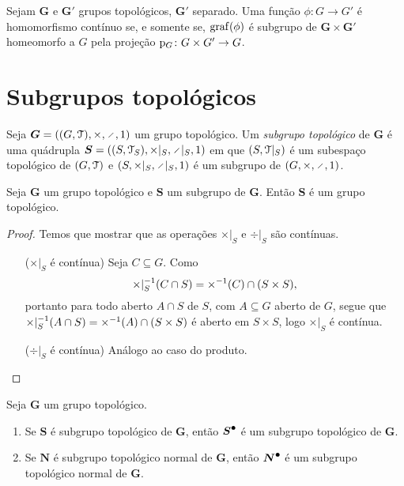 \begin{proposition}
Sejam $\bm G$ e $\bm G'$ grupos topológicos, $\bm G'$ separado. Uma função $\phi\colon G \to G'$ é homomorfismo contínuo se, e somente se,
$\operatorname{graf}(\phi)$ é subgrupo de $\bm G \times \bm G'$ homeomorfo a $G$ pela projeção $\mathrm{p}_G\colon G \times G' \to G$.
\end{proposition}

\section{Subgrupos topológicos}

\begin{definition}
Seja $\bm G = ((G,\topo),\times,\div,\id)$ um grupo topológico. Um \emph{subgrupo topológico} de $\bm G$ é uma quádrupla $\bm S = ((S,\topo_S),\times|_S,\div|_S,\id)$ em que $(S,\mathcal{T}|_S)$ é um subespaço topológico de $(G,\mathcal{T})$ e $(S,\times|_S,\div|_S,\id)$ é um subgrupo de $(G,\times,\div,\id)$.
\end{definition}

\begin{proposition}
Seja $\bm G$ um grupo topológico e $\bm S$ um subgrupo de $\bm G$. Então $\bm S$ é um grupo topológico.
\end{proposition}
\begin{proof}
Temos que mostrar que as operações $\times|_S$ e $\div|_S$ são contínuas.
	\begin{enumerate}[wide, labelwidth=!, labelindent=0pt]
	\item[($\times|_S$ é contínua)]
		Seja $C \subseteq G$. Como
		\begin{equation*}
		\times|_S ^{-1} (C \cap S) = \times ^{-1} (C) \cap (S \times S),
		\end{equation*}
		portanto para todo aberto $A \cap S$ de $S$, com $A \subseteq G$ aberto de $G$, segue que $\times|_S ^{-1} (A \cap S) = \times ^{-1} (A) \cap (S \times S)$ é aberto em $S \times S$, logo $\times|_S$ é contínua.
	\item[($\div|_S$ é contínua)]
		Análogo ao caso do produto. \qedhere
	\end{enumerate}
\end{proof}

\begin{proposition}
Seja $\bm G$ um grupo topológico.
	\begin{enumerate}
	\item Se $\bm S$ é subgrupo topológico de $\bm G$, então $\bm{{S}^\bullet}$ é um subgrupo topológico de $\bm G$.
	\item Se $\bm N$ é subgrupo topológico normal de $\bm G$, então $\bm{{N}^\bullet}$ é um subgrupo topológico normal de $\bm G$.
	\end{enumerate}
\end{proposition}

